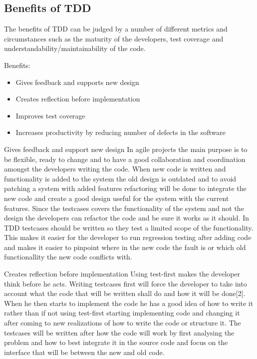 \subsection{Benefits of TDD} 
The benefits of TDD can be judged by a number of different metrics and circumstances such as the maturity of the developers, test coverage and understandability/maintainability of the code.

Benefits:
\begin{itemize}
\item Gives feedback and supports new design
\item Creates reflection before implementation
\item Improves test coverage
\item Increases productivity by reducing number of defects in the software
\end{itemize}

Gives feedback and support new design
In agile projects the main purpose is to be flexible, ready to change and to have a good collaboration and coordination amongst the developers writing the code. When new code is written and functionality is added to the system the old design is outdated and to avoid patching a system with added features refactoring will be done to integrate the new code and create a good design useful for the system with the current features. 
Since the testcases covers the functionality of the system and not the design the developers can refactor the code and be sure it works as it should. 
In TDD testcases should be written so they test a limited scope of the functionality. This makes it easier for the developer to run regression testing after adding code and makes it easier to pinpoint where in the new code the fault is or which old functionallity the new code conflicts with.

Creates reflection before implementation
Using test-first makes the developer think before he acts. Writing testcases first will force the developer to take into account what the code that will be written shall do and how it will be done[2]. When he then starts to implement the code he has a good idea of how to write it rather than if not using test-first starting implementing code and changing it after coming to new realizations of how to write the code or structure it. The testcases will be written after how the code will work by first analysing the problem and how to best integrate it in the source code and focus on the interface that will be between the new and old code.

